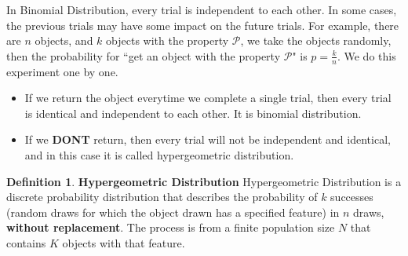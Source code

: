 \documentclass{article}
\theoremstyle{definition}
\newtheorem{defi}{Definition}[section]
\begin{document}
In Binomial Distribution, every trial is independent to each other. In some cases, the previous trials may have some impact on the future trials. For example, there are $n$ objects, and $k$ objects with the property $\mathcal{P}$, we take the objects randomly, then the probability for ``get an object with the property $\mathcal{P}$" is $p=\frac{k}{n}$. We do this experiment one by one.
\begin{itemize}
    \item If we return the object everytime we complete a single trial, then every trial is identical and independent to each other. It is binomial distribution.
    \item If we \textbf{DONT} return, then every trial will not be independent and identical, and in this case it is called hypergeometric distribution.
\end{itemize}

\begin{defi}
\textbf{Hypergeometric Distribution} Hypergeometric Distribution is a discrete probability distribution that describes the probability of $k$ successes (random draws for which the object drawn has a specified feature) in $n$ draws, \textbf{without replacement}. The process is from a finite population size $N$ that contains $K$ objects with that feature.
\end{defi}
\end{document}
